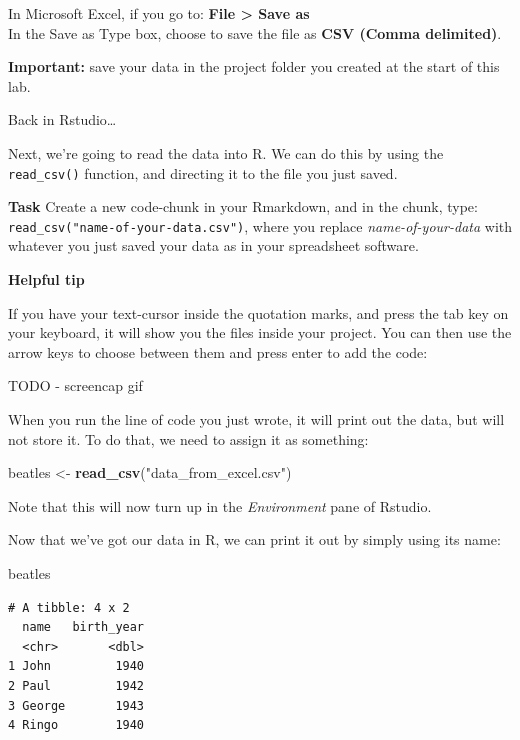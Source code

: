 \documentclass[]{book}
\newenvironment{Shaded}{\begin{snugshade}}{\end{snugshade}}
\newcommand{\KeywordTok}[1]{\textcolor[rgb]{0.13,0.29,0.53}{\textbf{#1}}}
\newcommand{\NormalTok}[1]{#1}
\newcommand{\StringTok}[1]{\textcolor[rgb]{0.31,0.60,0.02}{#1}}
\begin{document}
In Microsoft Excel, if you go to:
\textbf{File \textgreater{} Save as}\\
In the Save as Type box, choose to save the file as \textbf{CSV (Comma delimited)}.

\textbf{Important:} save your data in the project folder you created at the start of this lab.

Back in Rstudio\ldots{}

Next, we're going to read the data into R. We can do this by using the \texttt{read\_csv()} function, and directing it to the file you just saved.

\textbf{Task}
Create a new code-chunk in your Rmarkdown, and in the chunk, type:
\texttt{read\_csv("name-of-your-data.csv")}, where you replace \emph{name-of-your-data} with whatever you just saved your data as in your spreadsheet software.

\textbf{Helpful tip}

If you have your text-cursor inside the quotation marks, and press the tab key on your keyboard, it will show you the files inside your project. You can then use the arrow keys to choose between them and press enter to add the code:

TODO - screencap gif

When you run the line of code you just wrote, it will print out the data, but will not store it. To do that, we need to assign it as something:

\begin{Shaded}
\begin{Highlighting}[]
\NormalTok{beatles <-}\StringTok{ }\KeywordTok{read_csv}\NormalTok{(}\StringTok{"data_from_excel.csv"}\NormalTok{)}
\end{Highlighting}
\end{Shaded}

Note that this will now turn up in the \emph{Environment} pane of Rstudio.

Now that we've got our data in R, we can print it out by simply using its name:

\begin{Shaded}
\begin{Highlighting}[]
\NormalTok{beatles}
\end{Highlighting}
\end{Shaded}

\begin{verbatim}
# A tibble: 4 x 2
  name   birth_year
  <chr>       <dbl>
1 John         1940
2 Paul         1942
3 George       1943
4 Ringo        1940
\end{verbatim}
\end{document}
